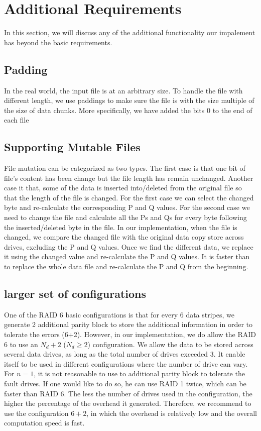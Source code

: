 \section{Additional Requirements}

In this section, we will discuss any of the additional functionality our impalement has beyond the basic requirements. 

\subsection{Padding}

In the real world, the input file is at an arbitrary size. To handle the file with different length, we use paddings to make sure the file is with the size multiple of the size of data chunks. More specifically, we have added the bits 0 to the end of each file 

\subsection{Supporting Mutable Files}

File mutation can be categorized as two types. The first case is that one bit of file’s content has been change but the file length has remain unchanged. Another case it that, some of the data is inserted into/deleted from the original file so that the length of the file is changed. For the first case we can select the changed byte and re-calculate the corresponding P and Q values. For the second case we need to change the file and calculate all the Ps and Qs for every byte following the inserted/deleted byte in the file.
In our implementation, when the file is changed, we compare the changed file with the original data copy store across drives, excluding the P and Q values. Once we find the different data, we replace it using the changed value and re-calculate the P and Q values. It is faster than to replace the whole data file and re-calculate the P and Q from the beginning.

\subsection{larger set of configurations}

One of the RAID 6 basic configurations is that for every 6 data stripes, we generate 2 additional parity block to store the additional information in order to tolerate the errors (6+2). However, in our implementation, we do allow the RAID 6 to use an $N_d+2$ ($N_d \geq 2$) configuration. We allow the data to be stored across several data drives, as long as the total number of drives exceeded 3. It enable itself to be used in different configurations where the number of drive can vary. For $n = 1$, it is not reasonable to use to additional parity block to tolerate the fault drives. If one would like to do so, he can use RAID 1 twice, which can be faster than RAID 6. The less the number of drives used in the configuration, the higher the percentage of the overhead it generated. Therefore, we recommend to use the configuration $6 + 2$, in which the overhead is relatively low and the overall computation speed is fast.


